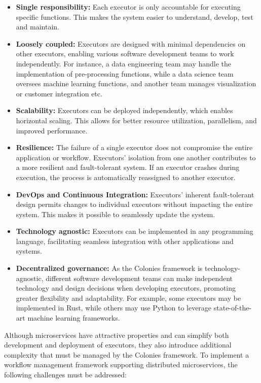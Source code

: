 \documentclass{article}
\begin{document}
\begin{itemize}
\item \textbf{Single responsibility:} Each executor is only accountable for executing specific functions. This makes the system easier to understand, develop, test and maintain.  
\item \textbf{Loosely coupled:} Executors are designed with minimal dependencies on other executors, enabling various software development teams to work independently. For instance, a data engineering team may handle the implementation of pre-processing functions, while a data science team oversees machine learning functions, and another team manages visualization or customer integration etc.

\item \textbf{Scalability:} Executors can be deployed independently, which enables horizontal scaling. This allows for better resource utilization, parallelism, and improved performance. 

\item \textbf{Resilience:} The failure of a single executor does not compromise the entire application or workflow. Executors' isolation from one another contributes to a more resilient and fault-tolerant system. If an executor crashes during execution, the process is automatically reassigned to another executor.

\item \textbf{DevOps and Continuous Integration:} Executors' inherent fault-tolerant design permits changes to individual executors without impacting the entire system. This makes it possible to seamlessly update the system. 

\item \textbf{Technology agnostic:} Executors can be implemented in any programming language, facilitating seamless integration with other applications and systems.

\item \textbf{Decentralized governance:} As the Colonies framework is technology-agnostic, different software development teams can make independent technology and design decisions when developing executors, promoting greater flexibility and adaptability. For example, some executors may be implemented in Rust, while others may use Python to leverage state-of-the-art machine learning frameworks.
\end{itemize}

Although microservices have attractive properties and can simplify both development and deployment of executors, they also introduce additional complexity that must be managed by the Colonies framework. To implement a workflow management framework supporting distributed microservices, the following challenges must be addressed:
\end{document}
